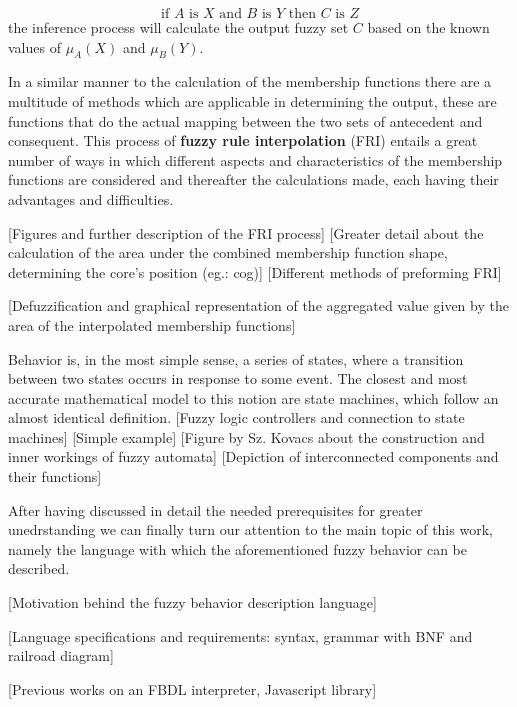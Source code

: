 \[
	\text{if } A \text{ is } X \text{ and } B \text{ is } Y \text{ then } C \text{ is } Z
\]
the inference process will calculate the output fuzzy set $C$ based on the known values of $\mu_A(X)$ and $\mu_B(Y)$.

In a similar manner to the calculation of the membership functions there are a multitude of methods which are applicable in determining the output, these are functions that do the actual mapping between the two sets of antecedent and consequent. This process of \textbf{fuzzy rule interpolation} (FRI) entails a great number of ways in which different aspects and characteristics of the membership functions are considered and thereafter the calculations made, each having their advantages and difficulties.

[Figures and further description of the FRI process]
[Greater detail about the calculation of the area under the combined membership function shape, determining the core's position (eg.: cog)]
[Different methods of preforming FRI]

[Defuzzification and graphical representation of the aggregated value given by the area of the interpolated membership functions]

Behavior is, in the most simple sense, a series of states, where a transition between two states occurs in response to some event. The closest and most accurate mathematical model to this notion are state machines, which follow an almost identical definition.
[Fuzzy logic controllers and connection to state machines]
[Simple example]
[Figure by Sz. Kovacs about the construction and inner workings of fuzzy automata]
[Depiction of interconnected components and their functions]

After having discussed in detail the needed prerequisites for greater unedrstanding we can finally turn our attention to the main topic of this work, namely the language with which the aforementioned fuzzy behavior can be described. 

[Motivation behind the fuzzy behavior description language]

[Language specifications and requirements: syntax, grammar with BNF and railroad diagram]

[Previous works on an FBDL interpreter, Javascript library]

